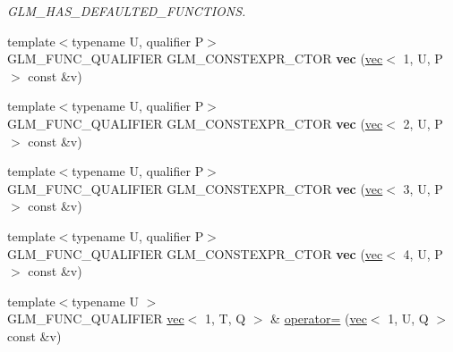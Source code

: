\begin{DoxyCompactItemize}
\begin{DoxyCompactList}\small\item\em G\+L\+M\+\_\+\+H\+A\+S\+\_\+\+D\+E\+F\+A\+U\+L\+T\+E\+D\+\_\+\+F\+U\+N\+C\+T\+I\+O\+NS. \end{DoxyCompactList}\item 
\mbox{\label{structglm_1_1vec_3_011_00_01T_00_01Q_01_4_ab8d935770c08c100f574755cf3ab3206}} 
{\footnotesize template$<$typename U, qualifier P$>$ }\\G\+L\+M\+\_\+\+F\+U\+N\+C\+\_\+\+Q\+U\+A\+L\+I\+F\+I\+ER G\+L\+M\+\_\+\+C\+O\+N\+S\+T\+E\+X\+P\+R\+\_\+\+C\+T\+OR {\bfseries vec} (\hyperlink{structglm_1_1vec}{vec}$<$ 1, U, P $>$ const \&v)
\item 
\mbox{\label{structglm_1_1vec_3_011_00_01T_00_01Q_01_4_ab8eadeb013caada0e6a27cfa842ca8da}} 
{\footnotesize template$<$typename U, qualifier P$>$ }\\G\+L\+M\+\_\+\+F\+U\+N\+C\+\_\+\+Q\+U\+A\+L\+I\+F\+I\+ER G\+L\+M\+\_\+\+C\+O\+N\+S\+T\+E\+X\+P\+R\+\_\+\+C\+T\+OR {\bfseries vec} (\hyperlink{structglm_1_1vec}{vec}$<$ 2, U, P $>$ const \&v)
\item 
\mbox{\label{structglm_1_1vec_3_011_00_01T_00_01Q_01_4_adb99870d209d6225f67a5d12e8f04df5}} 
{\footnotesize template$<$typename U, qualifier P$>$ }\\G\+L\+M\+\_\+\+F\+U\+N\+C\+\_\+\+Q\+U\+A\+L\+I\+F\+I\+ER G\+L\+M\+\_\+\+C\+O\+N\+S\+T\+E\+X\+P\+R\+\_\+\+C\+T\+OR {\bfseries vec} (\hyperlink{structglm_1_1vec}{vec}$<$ 3, U, P $>$ const \&v)
\item 
\mbox{\label{structglm_1_1vec_3_011_00_01T_00_01Q_01_4_a488f936163dd6df03df27373e8337869}} 
{\footnotesize template$<$typename U, qualifier P$>$ }\\G\+L\+M\+\_\+\+F\+U\+N\+C\+\_\+\+Q\+U\+A\+L\+I\+F\+I\+ER G\+L\+M\+\_\+\+C\+O\+N\+S\+T\+E\+X\+P\+R\+\_\+\+C\+T\+OR {\bfseries vec} (\hyperlink{structglm_1_1vec}{vec}$<$ 4, U, P $>$ const \&v)
\item 
\mbox{\label{structglm_1_1vec_3_011_00_01T_00_01Q_01_4_a429731c0d8a4e996cd3510f0dbafcb34}} 
{\footnotesize template$<$typename U $>$ }\\G\+L\+M\+\_\+\+F\+U\+N\+C\+\_\+\+Q\+U\+A\+L\+I\+F\+I\+ER \hyperlink{structglm_1_1vec}{vec}$<$ 1, T, Q $>$ \& \hyperlink{structglm_1_1vec_3_011_00_01T_00_01Q_01_4_a429731c0d8a4e996cd3510f0dbafcb34}{operator=} (\hyperlink{structglm_1_1vec}{vec}$<$ 1, U, Q $>$ const \&v)

\end{DoxyCompactItemize}
